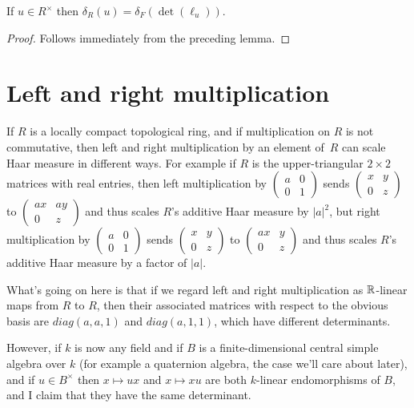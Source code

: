   \begin{corollary}
  \label{MeasureTheory.algebra_ringHaarChar_eq_ringHaarChar_det}
  \leanok
  If $u\in R^\times$ then $\delta_R(u)=\delta_F(\det(\ell_u))$.
\end{corollary}
\begin{proof}
  \leanok
  Follows immediately from the preceding lemma.
\end{proof}

\section{Left and right multiplication}

If $R$ is a locally compact topological ring, and if multiplication on $R$ is not commutative,
then left and right multiplication by an element of~$R$ can scale Haar measure in different ways.
For example if $R$ is the upper-triangular $2\times 2$ matrices with real
entries, then left multiplication by $\begin{pmatrix}a&0\\0&1\end{pmatrix}$
sends $\begin{pmatrix}x&y\\0&z\end{pmatrix}$ to $\begin{pmatrix}ax&ay\\0&z\end{pmatrix}$
and thus scales $R$'s additive
Haar measure by $|a|^2$, but right multiplication by $\begin{pmatrix}a&0\\0&1\end{pmatrix}$
sends $\begin{pmatrix}x&y\\0&z\end{pmatrix}$ to $\begin{pmatrix}ax&y\\0&z\end{pmatrix}$
and thus scales $R$'s additive Haar measure by a factor of $|a|$.

What's going on here is that if we regard left and right multiplication as $\mathbb{R}$-linear
maps from $R$ to $R$, then their associated matrices with respect to the obvious basis
are $diag(a,a,1)$ and $diag(a,1,1)$, which have different determinants.

However, if $k$ is now any field and if $B$ is a finite-dimensional central
simple algebra over $k$ (for example a quaternion algebra, the case we'll care about later),
and if $u\in B^\times$ then $x\mapsto ux$ and $x\mapsto xu$
are both $k$-linear endomorphisms of $B$, and I claim that they have
the same determinant.

